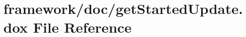 \hypertarget{get_started_update_8dox}{}\section{framework/doc/get\+Started\+Update.dox File Reference}
\label{get_started_update_8dox}
